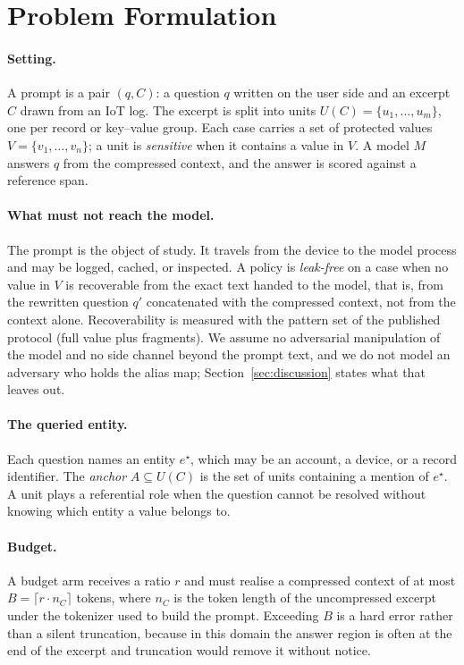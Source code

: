 \section{Problem Formulation}
\label{sec:problem}

\paragraph{Setting.}
A prompt is a pair $(q, C)$: a question $q$ written on the user side and an excerpt $C$
drawn from an IoT log. The excerpt is split into units $U(C)=\{u_1,\dots,u_m\}$, one per
record or key--value group. Each case carries a set of protected values
$V=\{v_1,\dots,v_n\}$; a unit is \emph{sensitive} when it contains a value in $V$. A model
$M$ answers $q$ from the compressed context, and the answer is scored against a reference
span.

\paragraph{What must not reach the model.}
The prompt is the object of study. It travels from the device to the model process and may
be logged, cached, or inspected. A policy is \emph{leak-free} on a case when no value in $V$
is recoverable from the exact text handed to the model, that is, from the rewritten question
$q'$ concatenated with the compressed context, not from the context alone. Recoverability is
measured with the pattern set of the published protocol (full value plus fragments). We
assume no adversarial manipulation of the model and no side channel beyond the prompt text,
and we do not model an adversary who holds the alias map; Section~\ref{sec:discussion}
states what that leaves out.

\paragraph{The queried entity.}
Each question names an entity $e^\star$, which may be an account, a device, or a record
identifier. The \emph{anchor} $A\subseteq U(C)$ is the set of units containing a mention of
$e^\star$. A unit plays a referential role when the question cannot be resolved without
knowing which entity a value belongs to.

\paragraph{Budget.}
A budget arm receives a ratio $r$ and must realise a compressed context of at most
$B=\lceil r\cdot n_C\rceil$ tokens, where $n_C$ is the token length of the uncompressed
excerpt under the tokenizer used to build the prompt. Exceeding $B$ is a hard error rather
than a silent truncation, because in this domain the answer region is often at the end of the
excerpt and truncation would remove it without notice.

